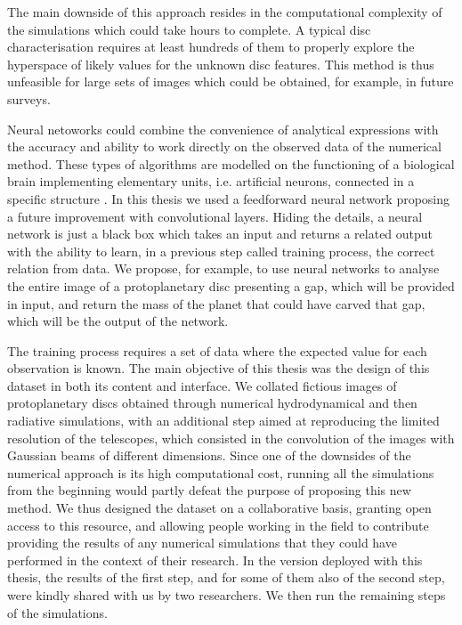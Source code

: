 \documentclass[a4paper,10pt, margin=1cm]{article}
\begin{document}
The main downside of this approach resides in the computational complexity of the simulations which 
could take hours to complete. A typical disc characterisation requires at least
hundreds of them to properly explore 
the hyperspace of likely values for the unknown disc features. This method is
thus unfeasible for large sets of images which could be obtained, for example, in future surveys.

Neural netoworks could combine the convenience of analytical expressions with the accuracy and ability to work directly on the observed data
of the numerical method. These types of algorithms are modelled on the functioning of a biological brain implementing 
elementary units, i.e. artificial neurons, connected in a specific structure \citep{ml4physics}. In this thesis we used a feedforward neural network 
proposing a future improvement with convolutional layers.
Hiding the details, a neural network is just a black box which takes an input and returns a related output with the ability 
to learn, in a previous step called training process, the correct relation from data. We propose, for example, to use neural networks
to analyse the entire image of a protoplanetary disc presenting a gap, which will be provided in input, and return the mass of the 
planet that could have carved that gap, which will be the output of the network. 

The training process requires a set of data where the expected value for each observation is known.
The main objective of this thesis was the design of this dataset in both its content and interface.
We collated fictious images of protoplanetary discs
obtained through numerical hydrodynamical and then radiative simulations, with
an additional step aimed at reproducing the limited resolution of the telescopes, which consisted in the convolution
of the images with
Gaussian beams of different dimensions.
Since one of the downsides of the numerical approach is its high computational cost, running all the simulations 
from the beginning would partly defeat the purpose of proposing this new method. 
We thus designed the dataset on a collaborative basis, granting open access to this resource, and allowing people working in the field
to contribute providing the results of any numerical simulations that they could have performed in the context of their research.
In the version deployed with this thesis, the results of the first step, and for some of them 
also of the second step, were kindly shared with us 
by two researchers.
We then run the remaining steps of the simulations.
\end{document}

